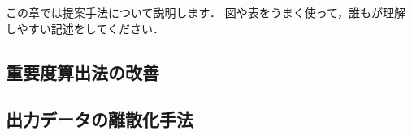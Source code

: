 この章では提案手法について説明します．
図や表をうまく使って，誰もが理解しやすい記述をしてください．

\subsection{重要度算出法の改善}

\subsection{出力データの離散化手法}
